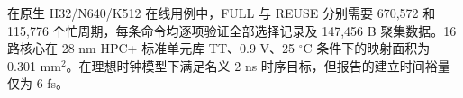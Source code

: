 在原生 H32/N640/K512 在线用例中，FULL 与 REUSE 分别需要 670,572 和 115,776 个忙周期，每条命令均逐项验证全部选择记录及 147,456 B 聚集数据。16 路核心在 28 nm HPC+ 标准单元库 TT、0.9 V、25 $^{\circ}$C 条件下的映射面积为 0.301 mm$^2$。在理想时钟模型下满足名义 2 ns 时序目标，但报告的建立时间裕量仅为 6 fs。
